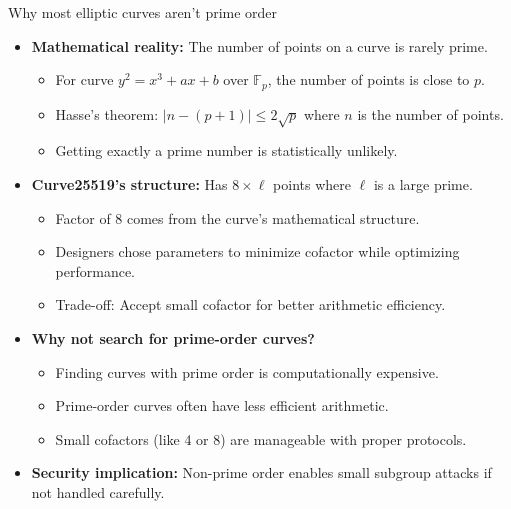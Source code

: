 \documentclass[aspectratio=169, lualatex, handout]{beamer}
\begin{document}
\begin{frame}{Why most elliptic curves aren't prime order}
	\begin{itemize}
		\item \textbf{Mathematical reality:} The number of points on a curve is rarely prime.
		      \begin{itemize}
			      \item For curve $y^2 = x^3 + ax + b$ over $\mathbb{F}_p$, the number of points is close to $p$.
			      \item Hasse's theorem: $|n - (p + 1)| \leq 2\sqrt{p}$ where $n$ is the number of points.
			      \item Getting exactly a prime number is statistically unlikely.
		      \end{itemize}
		\item \textbf{Curve25519's structure:} Has $8 \times \ell$ points where $\ell$ is a large prime.
		      \begin{itemize}
			      \item Factor of 8 comes from the curve's mathematical structure.
			      \item Designers chose parameters to minimize cofactor while optimizing performance.
			      \item Trade-off: Accept small cofactor for better arithmetic efficiency.
		      \end{itemize}
		\item \textbf{Why not search for prime-order curves?}
		      \begin{itemize}
			      \item Finding curves with prime order is computationally expensive.
			      \item Prime-order curves often have less efficient arithmetic.
			      \item Small cofactors (like 4 or 8) are manageable with proper protocols.
		      \end{itemize}
		\item \textbf{Security implication:} Non-prime order enables small subgroup attacks if not handled carefully.
	\end{itemize}
\end{frame}
\end{document}

